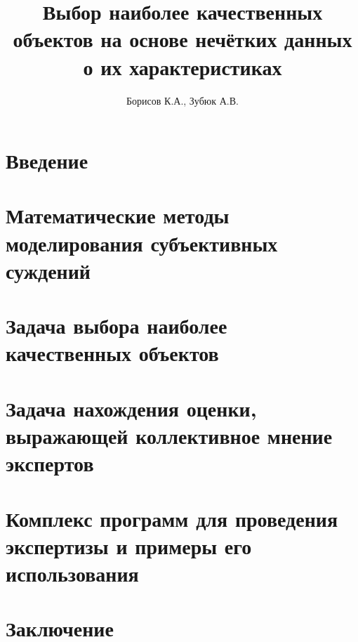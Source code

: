 \documentclass[14pt]{extarticle}
\begin{document}

\thispagestyle{empty}			

\title{Выбор наиболее качественных объектов на основе нечётких данных о их характеристиках} 
\author{Борисов К.А., Зубюк А.В.}
\maketitle

\tableofcontents
\newpage

\section{Введение} 


\section{Математические методы моделирования субъективных суждений}


\section{Задача выбора наиболее качественных объектов}
 

\section{Задача нахождения оценки, выражающей коллективное мнение экспертов}
 

\section{Комплекс программ для проведения экспертизы и примеры его использования }


\section{Заключение}
 

\printbibliography[heading=bibintoc]
\end{document}
